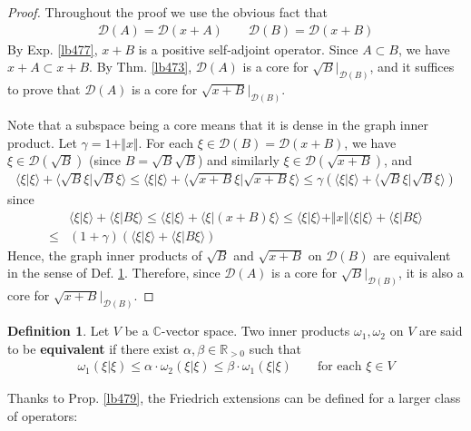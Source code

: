 \documentclass[12pt,b5paper,notitlepage]{article}
\theoremstyle{definition}
\newtheorem{df}{Definition}[subsection]
\theoremstyle{plain}
\newcommand{\Dom}{\mathscr{D}}
\newcommand{\bk}[1]{\langle {#1}\rangle}
\newcommand{\Cbb}{\mathbb C}
\newcommand{\Rbb}{\mathbb R}
\numberwithin{equation}{section}
\begin{document}
\begin{proof}
Throughout the proof we use the obvious fact that
\begin{align*}
\Dom(A)=\Dom(x+A)\qquad\Dom(B)=\Dom(x+B)
\end{align*}
By Exp. \ref{lb477}, $x+B$ is a positive self-adjoint operator. Since $A\subset B$, we have $x+A\subset x+B$. By Thm. \ref{lb473}, $\Dom(A)$ is a core for $\sqrt B|_{\Dom(B)}$, and it suffices to prove that $\Dom(A)$ is a core for $\sqrt{x+B}|_{\Dom(B)}$.

Note that a subspace being a core means that it is dense in the graph inner product. Let $\gamma=1+\Vert x\Vert$. For each $\xi\in\Dom(B)=\Dom(x+B)$, we have $\xi\in\Dom(\sqrt B)$ (since $B=\sqrt B\sqrt B$) and similarly $\xi\in\Dom(\sqrt{x+B})$, and
\begin{align*}
\bk{\xi|\xi}+\bk{\sqrt B\xi|\sqrt B\xi}\leq \bk{\xi|\xi}+\bk{\sqrt{x+B}\xi|\sqrt{x+B}\xi}\leq \gamma(\bk{\xi|\xi}+\bk{\sqrt B\xi|\sqrt B\xi})
\end{align*}
since
\begin{align*}
&\bk{\xi|\xi}+\bk{\xi|B\xi}\leq\bk{\xi|\xi}+\bk{\xi|(x+B)\xi}\leq \bk{\xi|\xi}+\Vert x\Vert\bk{\xi|\xi}+\bk{\xi|B\xi}\\
\leq&(1+\gamma)(\bk{\xi|\xi}+\bk{\xi|B\xi})
\end{align*}
Hence, the graph inner products of $\sqrt B$ and $\sqrt{x+B}$ on $\Dom(B)$ are equivalent in the sense of Def. \ref{lb481}. Therefore, since $\Dom(A)$ is a core for $\sqrt B|_{\Dom(B)}$, it is also a core for $\sqrt{x+B}|_{\Dom(B)}$. 
\end{proof}

\begin{df}\label{lb481}
Let $V$ be a $\Cbb$-vector space. Two inner products $\omega_1,\omega_2$ on $V$ are said to be \textbf{equivalent}  if there exist $\alpha,\beta\in\Rbb_{>0}$ such that
\begin{align*}
\omega_1(\xi|\xi)\leq\alpha\cdot\omega_2(\xi|\xi)\leq\beta\cdot\omega_1(\xi|\xi)\qquad\text{for each }\xi\in V
\end{align*}
\end{df}



Thanks to Prop. \ref{lb479}, the Friedrich extensions can be defined for a larger class of operators:
\end{document}
